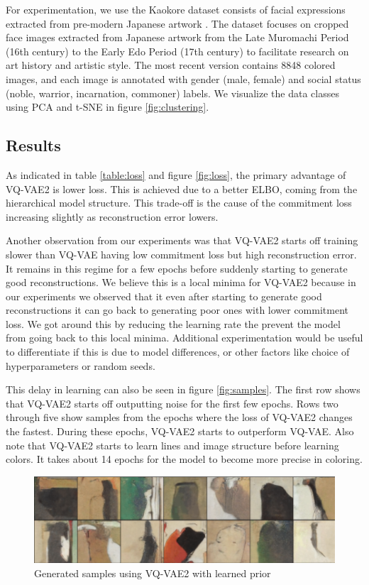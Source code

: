 \documentclass{article}
\begin{document}
For experimentation, we use the Kaokore dataset consists of facial expressions extracted from pre-modern Japanese artwork \cite{kaokore}. The dataset focuses on cropped face images extracted from Japanese artwork from the Late Muromachi Period (16th century) to the Early Edo Period (17th century) to facilitate research on art history and artistic style. The most recent version contains 8848 colored images, and each image is annotated with gender (male, female) and social status (noble, warrior, incarnation, commoner) labels. We visualize the data classes using PCA and t-SNE in figure \ref{fig:clustering}.

\subsection{Results}

As indicated in table \ref{table:loss} and figure \ref{fig:loss}, the primary advantage of VQ-VAE2 is lower loss. This is achieved due to a better ELBO, coming from the hierarchical model structure. This trade-off is the cause of the commitment loss increasing slightly as reconstruction error lowers. 

Another observation from our experiments was that VQ-VAE2 starts off training slower than VQ-VAE having low commitment loss but high reconstruction error. It remains in this regime for a few epochs before suddenly starting to generate good reconstructions. We believe this is a local minima for VQ-VAE2 because in our experiments we observed that it even after starting to generate good reconstructions it can go back to generating poor ones with lower commitment loss. We got around this by reducing the learning rate the prevent the model from going back to this local minima. Additional experimentation would be useful to differentiate if this is due to model differences, or other factors like choice of hyperparameters or random seeds. 

This delay in learning can also be seen in figure \ref{fig:samples}. The first row shows that VQ-VAE2 starts off outputting noise for the first few epochs. Rows two through five show samples from the epochs where the loss of VQ-VAE2 changes the fastest. During these epochs, VQ-VAE2 starts to outperform VQ-VAE. Also note that VQ-VAE2 starts to learn lines and image structure before learning colors. It takes about 14 epochs for the model to become more precise in coloring.

\begin{figure}
    \centering
    \includegraphics[width=0.7\linewidth]{generations.png}
    \caption{Generated samples using VQ-VAE2 with learned prior}
    \label{fig:generations}
\end{figure}
\end{document}
